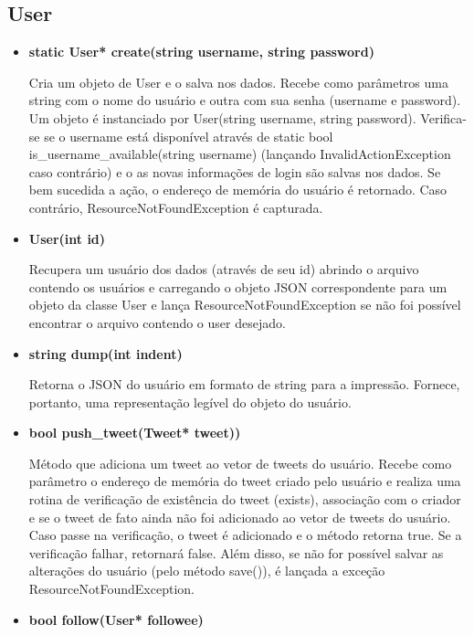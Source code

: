 \documentclass[a4paper]{article}
\begin{document}
\subsection{User}
\begin{itemize}
   \item \textbf{static User* create(string username, string password)}

    Cria um objeto de User e o salva nos dados. Recebe como parâmetros uma string com o nome do usuário e outra com sua senha (username e password). Um objeto é instanciado por User(string username, string password). Verifica-se se o username está disponível através de static bool is\_username\_available(string username) (lançando InvalidActionException caso contrário) e o as novas informações de login são salvas nos dados. Se bem sucedida a ação, o endereço de memória do usuário é retornado. Caso contrário, ResourceNotFoundException é capturada.

   \item \textbf{User(int id)}

   Recupera um usuário dos dados (através de seu id) abrindo o arquivo contendo os usuários e carregando o objeto JSON correspondente para um objeto da classe User e lança ResourceNotFoundException se não foi possível encontrar o arquivo contendo o user desejado.

   \item \textbf{string dump(int indent)}

   Retorna o JSON do usuário em formato de string para a impressão. Fornece, portanto, uma representação legível do objeto do usuário.

   \item \textbf{bool push\_tweet(Tweet* tweet))}

   Método que adiciona um tweet ao vetor de tweets do usuário. Recebe como parâmetro o endereço de memória do tweet criado pelo usuário e realiza uma rotina de verificação de existência do tweet (exists), associação com o criador e se o tweet de fato ainda não foi adicionado ao vetor de tweets do usuário. Caso passe na verificação, o tweet é adicionado e o método retorna true. Se a verificação falhar, retornará false. Além disso, se não for possível salvar as alterações do usuário (pelo método save()), é lançada a exceção ResourceNotFoundException.

    \item \textbf{bool follow(User* followee)}


\end{itemize}
\end{document}

